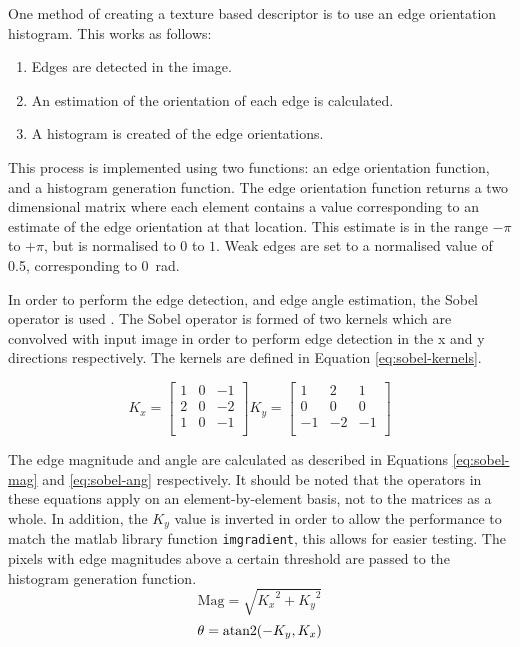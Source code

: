One method of creating a texture based descriptor is to use an edge orientation histogram. This works as follows:
\begin{enumerate}
	\item Edges are detected in the image.
	\item An estimation of the orientation of each edge is calculated.
	\item A histogram is created of the edge orientations.
\end{enumerate}

This process is implemented using two functions: an edge orientation function, and a histogram generation function. The edge orientation function returns a two dimensional matrix where each element contains a value corresponding to an estimate of the edge orientation at that location. This estimate is in the range $-\pi$ to $+\pi$, but is normalised to $0$ to $1$. Weak edges are set to a normalised value of 0.5, corresponding to \SI{0}{\radian}.

In order to perform the edge detection, and edge angle estimation, the Sobel operator is used \cite{sobel2015}. The Sobel operator is formed of two kernels which are convolved with input image in order to perform edge detection in the x and y directions respectively. The kernels are defined in Equation \ref{eq:sobel-kernels}. 

\begin{equation}
	K_x = 
	\begin{bmatrix}
	1 & 0 & -1 \\
	2 & 0 & -2 \\
	1 & 0 & -1 \\
	\end{bmatrix}
	K_y = 
	\begin{bmatrix}
	1 & 2 & 1 \\
	0 & 0 & 0 \\
	-1 & -2 & -1 \\
	\end{bmatrix}
	\label{eq:sobel-kernels}
\end{equation}

The edge magnitude and angle are calculated as described in Equations \ref{eq:sobel-mag} and \ref{eq:sobel-ang} respectively. It should be noted that the operators in these equations apply on an element-by-element basis, not to the matrices as a whole. In addition, the $K_y$ value is inverted in order to allow the performance to match the \gls{matlab} library function \texttt{imgradient}, this allows for easier testing. The pixels with edge magnitudes above a certain threshold are passed to the histogram generation function.
\begin{equation}
\text{Mag} = \sqrt{{K_x}^2 + {K_y}^2}
\label{eq:sobel-mag}
\end{equation}
\begin{equation}
\theta = \operatorname{atan2}(-K_y, K_x)
\label{eq:sobel-ang}
\end{equation}

